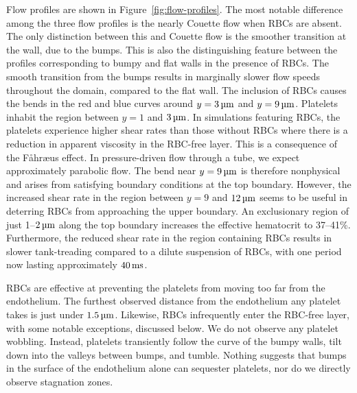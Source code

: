 Flow profiles are shown in Figure~\ref{fig:flow-profiles}. The most notable difference
among the three flow profiles is the nearly Couette flow when RBCs are absent. The only
distinction between this and Couette flow is the smoother transition at the wall, due to
the bumps. This is also the distinguishing feature between the profiles corresponding to
bumpy and flat walls in the presence of RBCs. The smooth transition from the bumps
results in marginally slower flow speeds throughout the domain, compared to the flat
wall. The inclusion of RBCs causes the bends in the red and blue curves around $y = 3\um$
and $y = 9\um$. Platelets inhabit the region between $y=1$ and $3\um$. In simulations
featuring RBCs, the platelets experience higher shear rates than those without RBCs where
there is a reduction in apparent viscosity in the RBC-free layer. This is a consequence
of the F\r{a}hr{\ae}us effect. In pressure-driven flow through a tube, we expect
approximately parabolic flow.  The bend near $y = 9\um$ is therefore nonphysical and
arises from satisfying boundary conditions at the top boundary. However, the increased
shear rate in the region between $y=9$ and $12\um$ seems to be useful in deterring RBCs
from approaching the upper boundary. An exclusionary region of just 1--$2\um$ along the
top boundary increases the effective hematocrit to 37--41\%. Furthermore, the reduced
shear rate in the region containing RBCs results in slower tank-treading compared to a
dilute suspension of RBCs, with one period now lasting approximately $40\ms$.

RBCs are effective at preventing the platelets from moving too far from the endothelium.
The furthest observed distance from the endothelium any platelet takes is just under
$1.5\um$. Likewise, RBCs infrequently enter the RBC-free layer, with some notable
exceptions, discussed below. We do not observe any platelet wobbling. Instead, platelets
transiently follow the curve of the bumpy walls, tilt down into the valleys between
bumps, and tumble. Nothing suggests that bumps in the surface of the endothelium alone
can sequester platelets, nor do we directly observe stagnation zones.

